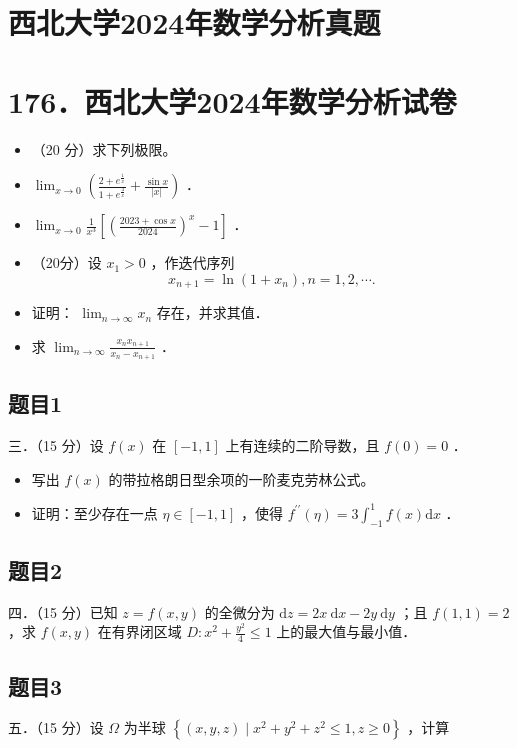 \documentclass{article}
\begin{document}
\section*{西北大学2024年数学分析真题}
\section*{176．西北大学2024年数学分析试卷}
\begin{itemize}
  \item[一．] （20 分）求下列极限。
  \item[（1）] \(\lim _{x \rightarrow 0}\left(\frac{2+e^{\frac{1}{x}}}{1+e^{\frac{4}{x}}}+\frac{\sin x}{|x|}\right)\) ．
  \item[（2）] \(\lim _{x \rightarrow 0} \frac{1}{x^{3}}\left[\left(\frac{2023+\cos x}{2024}\right)^{x}-1\right]\) ．
  \item[二．] （20分）设 \(x_{1}>0\) ，作迭代序列
\[
x_{n+1}=\ln \left(1+x_{n}\right), n=1,2, \cdots .
\]
  \item[（1）] 证明： \(\lim _{n \rightarrow \infty} x_{n}\) 存在，并求其值．
  \item[（2）] 求 \(\lim _{n \rightarrow \infty} \frac{x_{n} x_{n+1}}{x_{n}-x_{n+1}}\) ．
\end{itemize}

\subsection{题目1}
三．（15 分）设 \(f(x)\) 在 \([-1,1]\) 上有连续的二阶导数，且 \(f(0)=0\) ．

\begin{itemize}
  \item[（1）] 写出 \(f(x)\) 的带拉格朗日型余项的一阶麦克劳林公式。
  \item[（2）] 证明：至少存在一点 \(\eta \in[-1,1]\) ，使得 \(f^{\prime \prime}(\eta)=3 \int_{-1}^{1} f(x) \mathrm{d} x\) ．
\end{itemize}

\subsection{题目2}
四．（15 分）已知 \(z=f(x, y)\) 的全微分为 \(\mathrm{d} z=2 x \mathrm{~d} x-2 y \mathrm{~d} y\) ；且 \(f(1,1)=2\) ，求 \(f(x, y)\) 在有界闭区域 \(D: x^{2}+\frac{y^{2}}{4} \leq 1\) 上的最大值与最小值．

\subsection{题目3}
五．（15 分）设 \(\Omega\) 为半球 \(\left\{(x, y, z) \mid x^{2}+y^{2}+z^{2} \leq 1, z \geq 0\right\}\) ，计算
\end{document}
